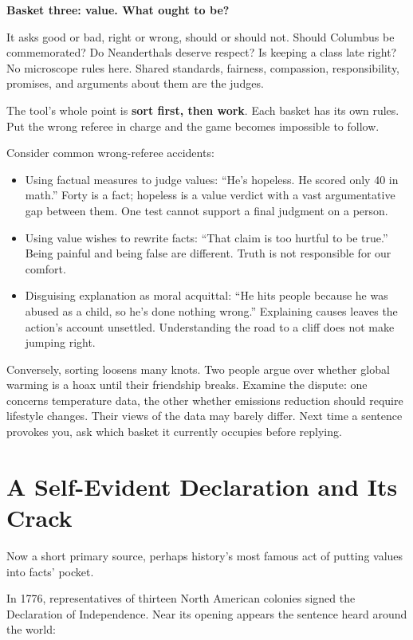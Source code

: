 \textbf{Basket three: value. What ought to be?}

It asks good or bad, right or wrong, should or should not. Should Columbus be commemorated? Do Neanderthals deserve respect? Is keeping a class late right? No microscope rules here. Shared standards, fairness, compassion, responsibility, promises, and arguments about them are the judges.

The tool's whole point is \textbf{sort first, then work}. Each basket has its own rules. Put the wrong referee in charge and the game becomes impossible to follow.

Consider common wrong-referee accidents:

\begin{itemize}
\item Using factual measures to judge values: ``He's hopeless. He scored only 40 in math.'' Forty is a fact; hopeless is a value verdict with a vast argumentative gap between them. One test cannot support a final judgment on a person.
\item Using value wishes to rewrite facts: ``That claim is too hurtful to be true.'' Being painful and being false are different. Truth is not responsible for our comfort.
\item Disguising explanation as moral acquittal: ``He hits people because he was abused as a child, so he's done nothing wrong.'' Explaining causes leaves the action's account unsettled. Understanding the road to a cliff does not make jumping right.
\end{itemize}
Conversely, sorting loosens many knots. Two people argue over whether global warming is a hoax until their friendship breaks. Examine the dispute: one concerns temperature data, the other whether emissions reduction should require lifestyle changes. Their views of the data may barely differ. Next time a sentence provokes you, ask which basket it currently occupies before replying.

\section{A Self-Evident Declaration and Its Crack}
Now a short primary source, perhaps history's most famous act of putting values into facts' pocket.

In 1776, representatives of thirteen North American colonies signed the Declaration of Independence. Near its opening appears the sentence heard around the world:

